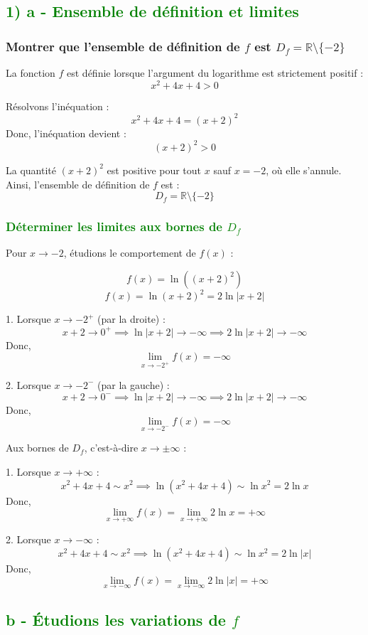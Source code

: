 \documentclass[12pt]{article}
\begin{document}
\subsection*{\textcolor{green}{1) a - Ensemble de définition et limites}}
\subsubsection*{Montrer que l'ensemble de définition de \( f \) est \( D_f = \mathbb{R} \setminus \{-2\} \)}
La fonction \( f \) est définie lorsque l'argument du logarithme est strictement positif :
\[
x^2 + 4x + 4 > 0
\]

Résolvons l'inéquation :
\[
x^2 + 4x + 4 = (x + 2)^2
\]
Donc, l'inéquation devient :
\[
(x + 2)^2 > 0
\]

La quantité \((x + 2)^2\) est positive pour tout \( x \) sauf \( x = -2 \), où elle s'annule. Ainsi, l'ensemble de définition de \( f \) est :
\[
D_f = \mathbb{R} \setminus \{-2\}
\]

\subsubsection*{\textcolor{green}{Déterminer les limites aux bornes de \( D_f \)}}
Pour \( x \to -2 \), étudions le comportement de \( f(x) \) :

\[
f(x) = \ln((x + 2)^2)
\]
\[
f(x) = \ln(x + 2)^2 = 2 \ln|x + 2|
\]

1. Lorsque \( x \to -2^+ \) (par la droite) :
\[
x + 2 \to 0^+ \implies \ln|x + 2| \to -\infty \implies 2 \ln|x + 2| \to -\infty
\]
Donc,
\[
\lim_{x \to -2^+} f(x) = -\infty
\]

2. Lorsque \( x \to -2^- \) (par la gauche) :
\[
x + 2 \to 0^- \implies \ln|x + 2| \to -\infty \implies 2 \ln|x + 2| \to -\infty
\]
Donc,
\[
\lim_{x \to -2^-} f(x) = -\infty
\]

Aux bornes de \( D_f \), c'est-à-dire \( x \to \pm \infty \) :

1. Lorsque \( x \to +\infty \) :
\[
x^2 + 4x + 4 \sim x^2 \implies \ln(x^2 + 4x + 4) \sim \ln x^2 = 2 \ln x
\]
Donc,
\[
\lim_{x \to +\infty} f(x) = \lim_{x \to +\infty} 2 \ln x = +\infty
\]

2. Lorsque \( x \to -\infty \) :
\[
x^2 + 4x + 4 \sim x^2 \implies \ln(x^2 + 4x + 4) \sim \ln x^2 = 2 \ln |x|
\]
Donc,
\[
\lim_{x \to -\infty} f(x) = \lim_{x \to -\infty} 2 \ln |x| = +\infty
\]

\subsection*{\textcolor{green}{b - Étudions les variations de \( f \)}}
\end{document}
